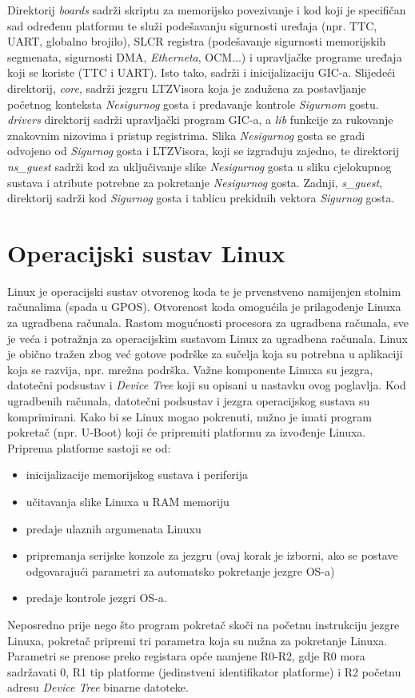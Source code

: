\documentclass[times, utf8, diplomski, numeric]{fer}
\begin{document}
Direktorij \textit{boards} sadrži skriptu za memorijsko povezivanje i kod koji je specifičan sad određenu platformu te služi
podešavanju sigurnosti uređaja (npr. TTC, UART, globalno brojilo), SLCR registra (podešavanje sigurnosti memorijskih
segmenata, sigurnosti DMA, \textit{Etherneta}, OCM...) i upravljačke programe uređaja koji se koriste (TTC i UART). Isto tako,
sadrži i inicijalizaciju GIC-a. Slijedeći direktorij, \textit{core}, sadrži jezgru LTZVisora koja je zadužena za postavljanje
početnog konteksta \textit{Nesigurnog} gosta i predavanje kontrole \textit{Sigurnom} gostu. \textit{drivers} direktorij sadrži upravljački
program GIC-a, a \textit{lib} funkcije za rukovanje znakovnim nizovima i pristup registrima. Slika \textit{Nesigurnog} gosta se gradi
odvojeno od \textit{Sigurnog} gosta i LTZVisora, koji se izgrađuju zajedno, te direktorij \textit{ns\_guest} sadrži kod za uključivanje
slike \textit{Nesigurnog} gosta u sliku cjelokupnog sustava i atribute potrebne za pokretanje \textit{Nesigurnog} gosta. Zadnji,
\textit{s\_guest}, direktorij sadrži kod \textit{Sigurnog} gosta i tablicu prekidnih vektora \textit{Sigurnog} gosta.

\chapter{Operacijski sustav Linux}
Linux je operacijski sustav otvorenog koda te je prvenstveno namijenjen stolnim računalima (spada u GPOS).
Otvorenost koda omogućila je prilagođenje Linuxa za ugradbena računala.
Rastom mogućnosti procesora za ugradbena računala, sve je veća i potražnja za operacijskim sustavom Linux za ugradbena
računala. Linux je obično tražen zbog već gotove podrške za sučelja koja su potrebna u aplikaciji koja se razvija, npr.
mrežna podrška. Važne komponente Linuxa su jezgra, datotečni podsustav i \textit{Device Tree} koji su opisani u nastavku
ovog poglavlja. Kod ugradbenih računala, datotečni podsustav i jezgra operacijskog sustava su komprimirani.
Kako bi se Linux mogao pokrenuti, nužno je imati program pokretač (npr. U-Boot) koji će pripremiti platformu za izvođenje
Linuxa. Priprema platforme sastoji se od:
\begin{itemize}
  \item{inicijalizacije memorijskog sustava i periferija}
  \item{učitavanja slike Linuxa u RAM memoriju}
  \item{predaje ulaznih argumenata Linuxu}
  \item{pripremanja serijske konzole za jezgru (ovaj korak je izborni, ako se postave odgovarajući parametri za automatsko
  pokretanje jezgre OS-a)}
  \item{predaje kontrole jezgri OS-a.}
\end{itemize}
Neposredno prije nego što program pokretač skoči na početnu instrukciju jezgre Linuxa, pokretač
pripremi tri parametra koja su nužna za pokretanje Linuxa. Parametri se prenose preko registara opće namjene R0-R2, gdje
R0 mora sadržavati 0, R1 tip platforme (jedinstveni identifikator platforme) i R2 početnu adresu \textit{Device Tree} binarne
datoteke.
\end{document}
